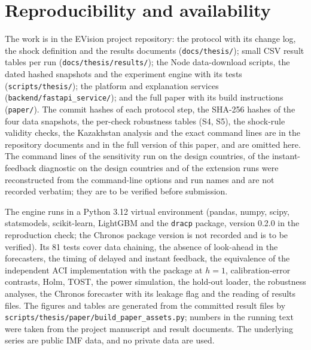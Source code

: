 \section{Reproducibility and availability}\label{sec:repro}

The work is in the EVision project repository: the protocol with its change log, the shock definition and the results documents (\texttt{docs/thesis/}); small CSV result tables per run (\texttt{docs/thesis/results/}); the Node data-download scripts, the dated hashed snapshots and the experiment engine with its tests (\texttt{scripts/thesis/}); the platform and explanation services (\texttt{backend/fastapi\_service/}); and the full paper with its build instructions (\texttt{paper/}). The commit hashes of each protocol step, the SHA-256 hashes of the four data snapshots, the per-check robustness tables (S4, S5), the shock-rule validity checks, the Kazakhstan analysis and the exact command lines are in the repository documents and in the full version of this paper, and are omitted here. The command lines of the sensitivity run on the design countries, of the instant-feedback diagnostic on the design countries and of the extension runs were reconstructed from the command-line options and run names and are not recorded verbatim; they are to be verified before submission.

The engine runs in a Python 3.12 virtual environment (pandas, numpy, scipy, statsmodels, scikit-learn, LightGBM and the \texttt{dracp} package, version 0.2.0 in the reproduction check; the Chronos package version is not recorded and is to be verified). Its 81 tests cover data chaining, the absence of look-ahead in the forecasters, the timing of delayed and instant feedback, the equivalence of the independent ACI implementation with the package at $h=1$, calibration-error contrasts, Holm, TOST, the power simulation, the hold-out loader, the robustness analyses, the Chronos forecaster with its leakage flag and the reading of results files. The figures and tables are generated from the committed result files by \texttt{scripts/thesis/paper/build\_paper\_assets.py}; numbers in the running text were taken from the project manuscript and result documents. The underlying series are public IMF data, and no private data are used.
